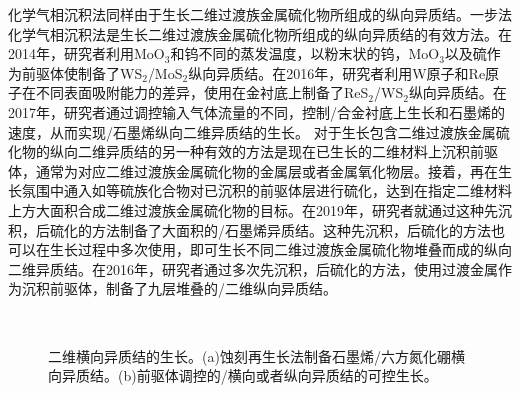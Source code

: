     化学气相沉积法同样由于生长二维过渡族金属硫化物所组成的纵向异质结。一步法化学气相沉积法是生长二维过渡族金属硫化物所组成的纵向异质结的有效方法。在2014年，研究者利用MoO$_3$和钨不同的蒸发温度，以粉末状的钨，MoO$_3$以及硫作为前驱体使制备了WS$_2$/MoS$_2$纵向异质结。在2016年，研究者利用W原子和Re原子在不同表面吸附能力的差异，使用在金衬底上制备了ReS$_2$/WS$_2$纵向异质结。在2017年，研究者通过调控输入气体流量的不同，控制/合金衬底上生长和石墨烯的速度，从而实现/石墨烯纵向二维异质结的生长。
    对于生长包含二维过渡族金属硫化物的纵向二维异质结的另一种有效的方法是现在已生长的二维材料上沉积前驱体，通常为对应二维过渡族金属硫化物的金属层或者金属氧化物层。接着，再在生长氛围中通入如等硫族化合物对已沉积的前驱体层进行硫化，达到在指定二维材料上方大面积合成二维过渡族金属硫化物的目标。在2019年，研究者就通过这种先沉积，后硫化的方法制备了大面积的/石墨烯异质结。这种先沉积，后硫化的方法也可以在生长过程中多次使用，即可生长不同二维过渡族金属硫化物堆叠而成的纵向二维异质结。在2016年，研究者通过多次先沉积，后硫化的方法，使用过渡金属作为沉积前驱体，制备了九层堆叠的/二维纵向异质结。

    \begin{figure}[htb]
        \\[-0.5ex]
        \caption{二维横向异质结的生长。(a)蚀刻再生长法制备石墨烯/六方氮化硼横向异质结。(b)前驱体调控的/横向或者纵向异质结的可控生长。}
    \end{figure}

